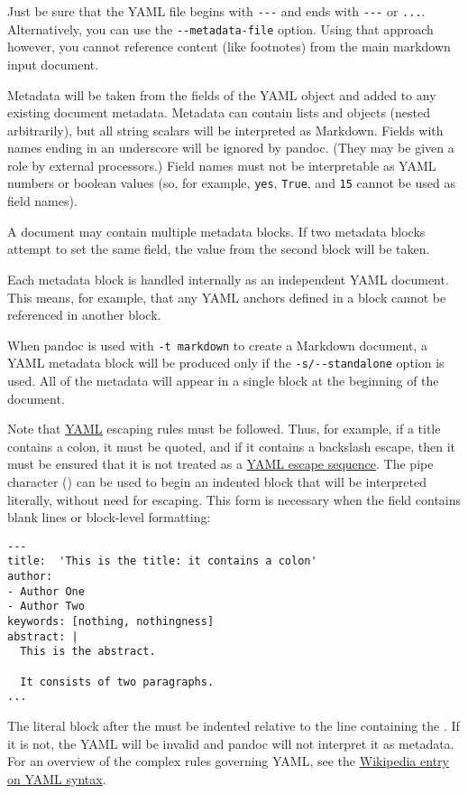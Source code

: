 \documentclass[
]{article}
\begin{document}
Just be sure that the YAML file begins with \texttt{-\/-\/-} and ends
with \texttt{-\/-\/-} or \texttt{...}. Alternatively, you can use the
\texttt{-\/-metadata-file} option. Using that approach however, you
cannot reference content (like footnotes) from the main markdown input
document.

Metadata will be taken from the fields of the YAML object and added to
any existing document metadata. Metadata can contain lists and objects
(nested arbitrarily), but all string scalars will be interpreted as
Markdown. Fields with names ending in an underscore will be ignored by
pandoc. (They may be given a role by external processors.) Field names
must not be interpretable as YAML numbers or boolean values (so, for
example, \texttt{yes}, \texttt{True}, and \texttt{15} cannot be used as
field names).

A document may contain multiple metadata blocks. If two metadata blocks
attempt to set the same field, the value from the second block will be
taken.

Each metadata block is handled internally as an independent YAML
document. This means, for example, that any YAML anchors defined in a
block cannot be referenced in another block.

When pandoc is used with \texttt{-t\ markdown} to create a Markdown
document, a YAML metadata block will be produced only if the
\texttt{-s/-\/-standalone} option is used. All of the metadata will
appear in a single block at the beginning of the document.

Note that \href{https://yaml.org/spec/1.2/spec.html}{YAML} escaping
rules must be followed. Thus, for example, if a title contains a colon,
it must be quoted, and if it contains a backslash escape, then it must
be ensured that it is not treated as a
\href{https://yaml.org/spec/1.2/spec.html\#id2776092}{YAML escape
sequence}. The pipe character (\texttt{\textbar{}}) can be used to begin
an indented block that will be interpreted literally, without need for
escaping. This form is necessary when the field contains blank lines or
block-level formatting:

\begin{verbatim}
---
title:  'This is the title: it contains a colon'
author:
- Author One
- Author Two
keywords: [nothing, nothingness]
abstract: |
  This is the abstract.

  It consists of two paragraphs.
...
\end{verbatim}

The literal block after the \texttt{\textbar{}} must be indented
relative to the line containing the \texttt{\textbar{}}. If it is not,
the YAML will be invalid and pandoc will not interpret it as metadata.
For an overview of the complex rules governing YAML, see the
\href{https://en.wikipedia.org/wiki/YAML\#Syntax}{Wikipedia entry on
YAML syntax}.
\end{document}

